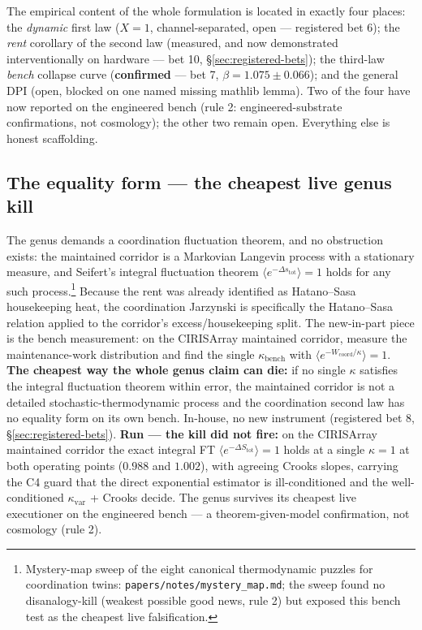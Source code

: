 \documentclass[11pt,a4paper]{article}
\begin{document}
The empirical content of the whole formulation is located in exactly four places: the \emph{dynamic} first law ($X = 1$, channel-separated, open --- registered bet 6); the \emph{rent} corollary of the second law (measured, and now demonstrated interventionally on hardware --- bet 10, \S\ref{sec:registered-bets}); the third-law \emph{bench} collapse curve (\textbf{confirmed} --- bet 7, $\beta = 1.075 \pm 0.066$); and the general DPI (open, blocked on one named missing mathlib lemma). Two of the four have now reported on the engineered bench (rule 2: engineered-substrate confirmations, not cosmology); the other two remain open. Everything else is honest scaffolding.

\subsection*{The equality form --- the cheapest live genus kill}

The genus demands a coordination fluctuation theorem, and no obstruction exists: the maintained corridor is a Markovian Langevin process with a stationary measure, and Seifert's integral fluctuation theorem $\langle e^{-\Delta s_{\text{tot}}}\rangle = 1$ holds for any such process.\footnote{Mystery-map sweep of the eight canonical thermodynamic puzzles for coordination twins: \texttt{papers/notes/mystery\_map.md}; the sweep found no disanalogy-kill (weakest possible good news, rule 2) but exposed this bench test as the cheapest live falsification.} Because the rent was already identified as Hatano--Sasa housekeeping heat, the coordination Jarzynski is specifically the Hatano--Sasa relation applied to the corridor's excess/housekeeping split. The new-in-part piece is the bench measurement: on the CIRISArray maintained corridor, measure the maintenance-work distribution and find the single $\kappa_{\text{bench}}$ with $\langle e^{-W_{\text{coord}}/\kappa}\rangle = 1$. \textbf{The cheapest way the whole genus claim can die:} if no single $\kappa$ satisfies the integral fluctuation theorem within error, the maintained corridor is not a detailed stochastic-thermodynamic process and the coordination second law has no equality form on its own bench. In-house, no new instrument (registered bet 8, \S\ref{sec:registered-bets}). \textbf{Run --- the kill did not fire:} on the CIRISArray maintained corridor the exact integral FT $\langle e^{-\Delta S_{\text{tot}}}\rangle = 1$ holds at a single $\kappa = 1$ at both operating points ($0.988$ and $1.002$), with agreeing Crooks slopes, carrying the C4 guard that the direct exponential estimator is ill-conditioned and the well-conditioned $\kappa_{\text{var}}$ + Crooks decide. The genus survives its cheapest live executioner on the engineered bench --- a theorem-given-model confirmation, not cosmology (rule 2).
\end{document}
